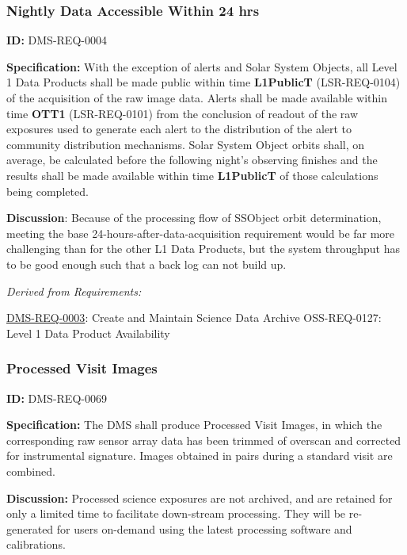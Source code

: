 \documentclass[SE,toc,lsstdraft]{lsstdoc}
\begin{document}
\subsubsection{Nightly Data Accessible Within 24 hrs}

\label{DMS-REQ-0004}
\textbf{ID:} DMS-REQ-0004

\textbf{Specification:} With the exception of alerts and Solar System Objects, all Level 1 Data Products shall be made public within time \textbf{L1PublicT} (LSR-REQ-0104) of the acquisition of the raw image data. Alerts shall be made available within time \textbf{OTT1} (LSR-REQ-0101) from the conclusion of readout of the raw exposures used to generate each alert to the distribution of the alert to community distribution mechanisms.  Solar System Object orbits shall, on average, be calculated before the following night's observing finishes and the results shall be made available within time \textbf{L1PublicT} of those calculations being completed.

\textbf{Discussion}: Because of the processing flow of SSObject orbit determination, meeting the base 24-hours-after-data-acquisition requirement would be far more challenging than for the other L1 Data Products, but the system throughput has to be good enough such that a back log can not build up.




\emph{Derived from Requirements:}

\hyperref[DMS-REQ-0003]{DMS-REQ-0003}:
Create and Maintain Science Data Archive  \newline
OSS-REQ-0127:
Level 1 Data Product Availability \newline


\subsubsection{Processed Visit Images}

\label{DMS-REQ-0069}
\textbf{ID:} DMS-REQ-0069

\textbf{Specification: }The DMS shall produce Processed Visit Images, in which the corresponding raw sensor array data has been trimmed of overscan and corrected for instrumental signature. Images obtained in pairs during a standard visit are combined.

\textbf{Discussion:} Processed science exposures are not archived, and are retained for only a limited time to facilitate down-stream processing. They will be re-generated for users on-demand using the latest processing software and calibrations.
\end{document}
